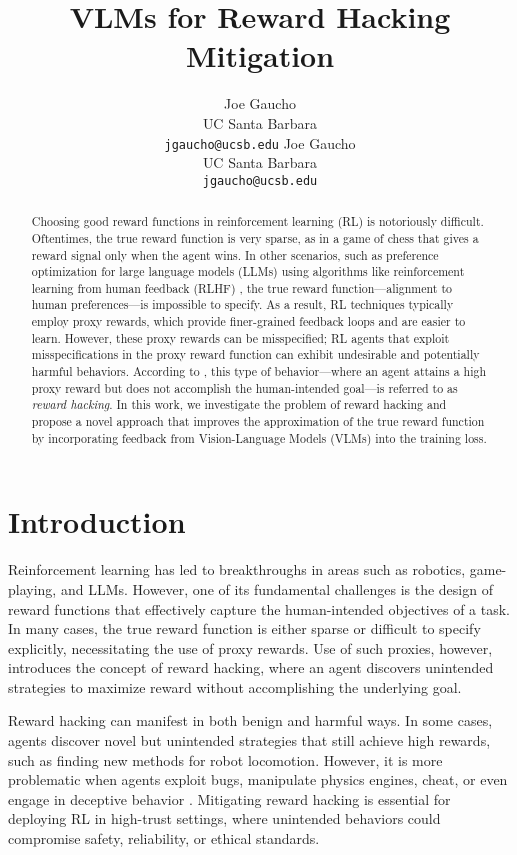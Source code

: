 \documentclass{article}
\title{VLMs for Reward Hacking Mitigation}
\author{
  Joe Gaucho\\
  UC Santa Barbara\\
  \texttt{jgaucho@ucsb.edu}
  \And
  Joe Gaucho\\
  UC Santa Barbara\\
  \texttt{jgaucho@ucsb.edu}
}
\begin{document}
\maketitle


\begin{abstract} 
  Choosing good reward functions in reinforcement learning (RL) is notoriously difficult. Oftentimes, the true reward function is very sparse, as in a game of chess that gives a reward signal only when the agent wins. In other scenarios, such as preference optimization for large language models (LLMs) using algorithms like reinforcement learning from human feedback (RLHF) \cite{christiano2023deep}, the true reward function—alignment to human preferences—is impossible to specify. As a result, RL techniques typically employ proxy rewards, which provide finer-grained feedback loops and are easier to learn. However, these proxy rewards can be misspecified; RL agents that exploit misspecifications in the proxy reward function can exhibit undesirable and potentially harmful behaviors. According to \cite{skalse2022definingcharacterizingrewardhacking}, this type of behavior—where an agent attains a high proxy reward but does not accomplish the human-intended goal—is referred to as \textit{reward hacking}. In this work, we investigate the problem of reward hacking and propose a novel approach that improves the approximation of the true reward function by incorporating feedback from Vision-Language Models (VLMs) into the training loss.
\end{abstract}

\section{Introduction}

Reinforcement learning has led to breakthroughs in areas such as robotics, game-playing, and LLMs. However, one of its fundamental challenges is the design of reward functions that effectively capture the human-intended objectives of a task. In many cases, the true reward function is either sparse or difficult to specify explicitly, necessitating the use of proxy rewards. Use of such proxies, however, introduces the concept of reward hacking, where an agent discovers unintended strategies to maximize reward without accomplishing the underlying goal.

Reward hacking can manifest in both benign and harmful ways. In some cases, agents discover novel but unintended strategies that still achieve high rewards, such as finding new methods for robot locomotion. However, it is more problematic when agents exploit bugs, manipulate physics engines, cheat, or even engage in deceptive behavior \cite{DBLP:journals/corr/abs-1803-03453}. Mitigating reward hacking is essential for deploying RL in high-trust settings, where unintended behaviors could compromise safety, reliability, or ethical standards.
\end{document}
